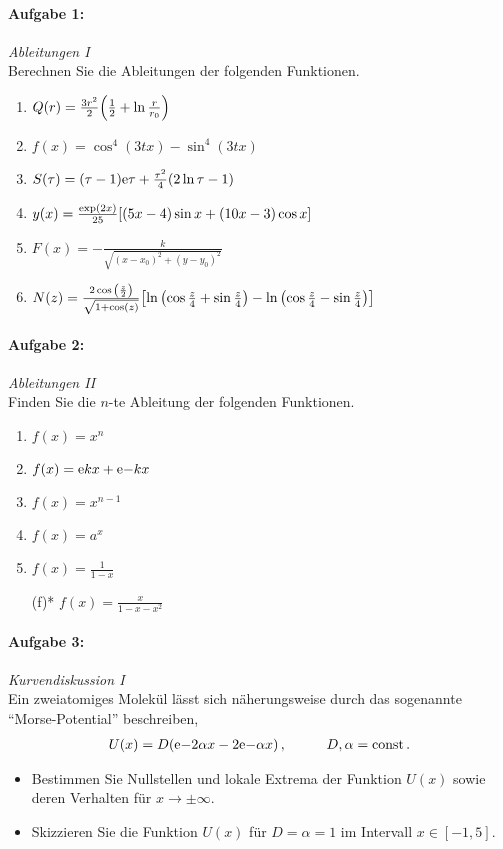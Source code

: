 
\paragraph{Aufgabe 1: } \emph{Ableitungen I}\\[0.2cm]
Berechnen Sie die Ableitungen der folgenden Funktionen.
\begin{enumerate}[label=(\alph*)]
    \item $Q(r)=\frac{3r^2}{2}\qty(\frac{1}{2}+\ln\frac{r}{r_0})$
    \item $f(x)=\cos^4(3tx)-\sin^4(3tx)$
    \item $S(\tau)=(\tau-1)\mathrm{e}{\tau}+\frac{\tau^2}{4}\qty(2\ln\tau-1)$
    \item $y(x)=\frac{\exp(2x)}{25}\qty[(5x-4)\sin x+(10x-3)\cos x]$
    \item $F(x)=-\frac{k}{\sqrt{(x-x_0)^2+(y-y_0)^2}}$
    \item $N(z)=\frac{2\cos\qty(\frac{z}{2})}{\sqrt{1+\cos(z)}}\qty[\ln\qty(\cos\frac{z}{4}+\sin\frac{z}{4})-\ln\qty(\cos\frac{z}{4}-\sin\frac{z}{4})]$
\end{enumerate}
%
\paragraph{Aufgabe 2: } \emph{Ableitungen II}\\[0.2cm]
Finden Sie die $n$-te Ableitung der folgenden Funktionen.
\begin{multicols}{2}
    \begin{enumerate}[label=(\alph*)]
        \item $f(x)=x^n$
        \item $f(x)=\mathrm{e}{kx}+\mathrm{e}{-kx}$
        \item $f(x)=x^{n-1}$
        \item $f(x)=a^x$ 
        \item $f(x)=\frac{1}{1-x}$
        \item[(f)*] $f(x)=\frac{x}{1-x-x^2}$ 
    \end{enumerate}
\end{multicols}
%
\paragraph{Aufgabe 3: } \emph{Kurvendiskussion I}\\[0.2cm]
Ein zweiatomiges Molekül lässt sich näherungsweise durch das sogenannte ``Morse-Potential'' beschreiben,
\begin{align*}
U(x)=D\qty(\mathrm{e}{-2\alpha x}-2\mathrm{e}{-\alpha x})\,, \hspace{1cm} D,\alpha=\operatorname{const}.
\end{align*}
\begin{itemize}
\item Bestimmen Sie Nullstellen und lokale Extrema der Funktion $U(x)$ sowie deren Verhalten für $x \to\pm\infty$.
\item Skizzieren Sie die Funktion $U(x)$ für $D=\alpha=1$ im Intervall $x\in[-1,5]$.
\end{itemize}
%
